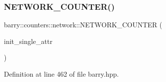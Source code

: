 \subsubsection{\texorpdfstring{N\+E\+T\+W\+O\+R\+K\+\_\+\+C\+O\+U\+N\+T\+E\+R()}{NETWORK\_COUNTER()}}
{\footnotesize\ttfamily barry\+::counters\+::network\+::\+N\+E\+T\+W\+O\+R\+K\+\_\+\+C\+O\+U\+N\+T\+ER (\begin{DoxyParamCaption}\item[{init\+\_\+single\+\_\+attr}]{ }\end{DoxyParamCaption})}



Definition at line 462 of file barry.\+hpp.

